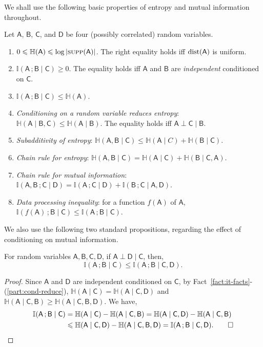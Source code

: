 \documentclass[11pt,letterpaper]{article}
\renewcommand{\geq}{\geqslant}
\renewcommand{\leq}{\leqslant}
\renewcommand{\ge}{\geq}
\theoremstyle{definition}
\newcommand{\supp}[1]{\ensuremath{\textsc{supp}(#1)}}
\newcommand{\rA}{\rv{A}}
\newcommand{\rB}{\rv{B}}
\newcommand{\rC}{\rv{C}}
\newcommand{\rD}{\rv{D}}
\newcommand{\rv}[1]{\ensuremath{\mathsf{#1}}}
\newcommand{\II}{\ensuremath{\mathbb{I}}}
\newcommand{\HH}{\ensuremath{\mathbb{H}}}
\newcommand{\mi}[2]{\ensuremath{\II(#1 \,; #2)}}
\newcommand{\en}[1]{\ensuremath{\HH(#1)}}
\newcommand{\itfacts}[1]{Fact~\ref{fact:it-facts}-(\ref{part:#1})\xspace}
\newcommand{\distribution}[1]{\ensuremath{\textnormal{dist}(#1)}\xspace}
\begin{document}
We shall use the following basic properties of entropy and mutual information throughout. 


\begin{fact}\label{fact:it-facts}
  Let $\rA$, $\rB$, $\rC$, and $\rD$ be four (possibly correlated) random variables.
   \begin{enumerate}
  \item \label{part:uniform} $0 \leq \en{\rA} \leq \log|\supp{\rA}|$. The right equality holds
    iff $\distribution{\rA}$ is uniform.
  \item \label{part:info-zero} $\mi{\rA}{\rB \mid \rC} \geq 0$. The equality holds iff $\rA$ and
    $\rB$ are \emph{independent} conditioned on $\rC$.
    \item \label{part:info-atmost-rv} $\mi{\rA}{\rB \mid \rC} \leq \en{\rA}$.
  \item \label{part:cond-reduce} \emph{Conditioning on a random variable reduces entropy}:
    $\en{\rA \mid \rB,\rC} \leq \en{\rA \mid  \rB}$.  The equality holds iff $\rA \perp \rC \mid \rB$.
    \item \label{part:sub-additivity} \emph{Subadditivity of entropy}: $\en{\rA,\rB \mid \rC}
    \leq \en{\rA \mid C} + \en{\rB \mid  \rC}$.
   \item \label{part:ent-chain-rule} \emph{Chain rule for entropy}: $\en{\rA,\rB \mid \rC} = \en{\rA \mid \rC} + \en{\rB \mid \rC,\rA}$.
  \item \label{part:chain-rule} \emph{Chain rule for mutual information}: $\mi{\rA,\rB}{\rC \mid \rD} = \mi{\rA}{\rC \mid \rD} + \mi{\rB}{\rC \mid  \rA,\rD}$.
  \item \label{part:data-processing} \emph{Data processing inequality}: for a function $f(\rA)$ of $\rA$, $\mi{f(\rA)}{\rB \mid \rC} \leq \mi{\rA}{\rB \mid \rC}$. 
   \end{enumerate}
\end{fact}


\noindent
We also use the following two standard propositions, regarding the effect of conditioning on mutual information.

\begin{proposition}\label{prop:info-increase}
  For random variables $\rA, \rB, \rC, \rD$, if $\rA \perp \rD \mid \rC$, then, 
  \[\mi{\rA}{\rB \mid \rC} \leq \mi{\rA}{\rB \mid  \rC,  \rD}.\]
\end{proposition}
 \begin{proof}
  Since $\rA$ and $\rD$ are independent conditioned on $\rC$, by
  \itfacts{cond-reduce}, $\HH(\rA \mid  \rC) = \HH(\rA \mid \rC, \rD)$ and $\HH(\rA \mid  \rC, \rB) \ge \HH(\rA \mid  \rC, \rB, \rD)$.  We have,
	 \begin{align*}
	  \mi{\rA}{\rB \mid  \rC} &= \HH(\rA \mid \rC) - \HH(\rA \mid \rC, \rB) = \HH(\rA \mid  \rC, \rD) - \HH(\rA \mid \rC, \rB) \\
	  &\leq \HH(\rA \mid \rC, \rD) - \HH(\rA \mid \rC, \rB, \rD) = \mi{\rA}{\rB \mid \rC, \rD}. \qed
	\end{align*}
	
\end{proof}
\end{document}
